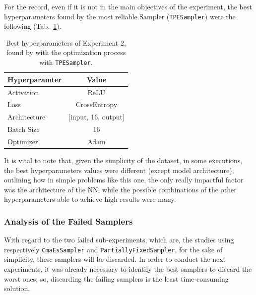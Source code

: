 For the record, even if it is not in the main objectives of the experiment, the best hyperparameters found by the most reliable Sampler (\texttt{TPESampler}) were the following (Tab.~\ref{tab:table-4.2.3}).
\begin{table}[ht!]
	\center
	\setlength{\tabcolsep}{0.5cm}
	\caption[Best Hyperparameters of Experiment 2]{Best hyperparameters of Experiment 2, found by with the optimization process with \texttt{TPESampler}.}
	\begin{tabular}{@{}lc@{}}
		\toprule
		\textbf{Hyperparamter} & \textbf{Value}          \\ \midrule
		Activation             & ReLU                    \\[0.1cm]
		Loss                   & CrossEntropy            \\[0.1cm]
		Architecture           & {[}input, 16, output{]} \\[0.1cm]
		Batch Size             & 16                      \\[0.1cm]
		Optimizer              & Adam                    \\ \bottomrule
	\end{tabular}
	\label{tab:table-4.2.3}
\end{table}
It is vital to note that, given the simplicity of the dataset, in some executions, the best hyperparameters values were different (except model architecture), outlining how in simple problems like this one, the only really impactful factor was the architecture of the NN, while the possible combinations of the other hyperparameters able to achieve high results were many.

\subsubsection{Analysis of the Failed Samplers}

With regard to the two failed sub-experiments, which are, the studies using respectively \texttt{CmaEsSampler} and \texttt{PartiallyFixedSampler}, for the sake of simplicity, these samplers will be discarded.
In order to conduct the next experiments, it was already necessary to identify the best samplers to discard the worst ones; so, discarding the failing samplers is the least time-consuming solution.

